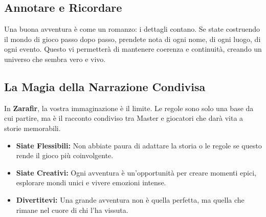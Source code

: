\documentclass[../manuale_main.tex]{subfiles}
\begin{document}
\vspace{0.3cm}

\subsection{Annotare e Ricordare}
Una buona avventura è come un romanzo: i dettagli contano. Se state costruendo il mondo di gioco passo dopo passo, prendete nota di ogni nome, di ogni luogo, di ogni evento. Questo vi permetterà di mantenere coerenza e continuità, creando un universo che sembra vero e vivo.

\vspace{0.3cm}

\subsection{La Magia della Narrazione Condivisa}
In \textbf{Zarafir}, la vostra immaginazione è il limite. Le regole sono solo una base da cui partire, ma è il racconto condiviso tra Master e giocatori che darà vita a storie memorabili. 

\begin{itemize}
    \item \textbf{Siate Flessibili:} Non abbiate paura di adattare la storia o le regole se questo rende il gioco più coinvolgente.
    
    \item \textbf{Siate Creativi:} Ogni avventura è un’opportunità per creare momenti epici, esplorare mondi unici e vivere emozioni intense.
    
    \item \textbf{Divertitevi:} Una grande avventura non è quella perfetta, ma quella che rimane nel cuore di chi l’ha vissuta.
\end{itemize}
\end{document}
